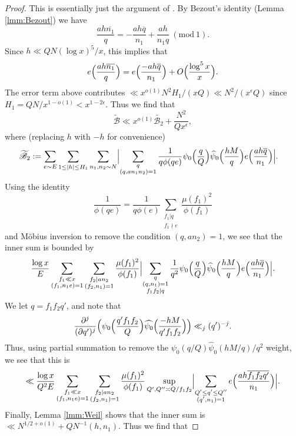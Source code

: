 \documentclass[10pt]{amsart}
\theoremstyle{plain}
\numberwithin{equation}{section}
\newcommand{\Mod}[1]{\ (\mathrm{mod}\ #1)}
\renewcommand{\hat}[1]{\widehat #1}
\begin{document}
\begin{proof}
This is essentially just the argument of \cite[\S5]{BFI1}. By Bezout's identity (Lemma \ref{lmm:Bezout}) we have
\[
\frac{ah \overline{n_1}}{q}=-\frac{ah \overline{q}}{n_1}+\frac{a h}{n_1q} \Mod{1}.
\]
Since $h\ll QN(\log{x})^5/x$, this implies that
\[
e\Bigl(\frac{a h \overline{n_1}}{q}\Bigr)=e\Bigl(\frac{- a h \overline{q}}{n_1}\Bigr)+O\Bigl(\frac{\log^5{x}}{x}\Bigr).
\]
The error term above contributes $\ll x^{o(1)} N^2 H_1 / (x Q)\ll N^2/(x^\epsilon Q)$ since $H_1=Q N/x^{1-o(1)}<x^{1-2\epsilon}$. Thus we find that
\[
\widetilde{\mathscr{B}}\ll x^{o(1)}\widetilde{\mathscr{B}_2}+\frac{N^2}{Q x^\epsilon},
\] 
where (replacing $h$ with $-h$ for convenience)
\begin{align*}
\widetilde{\mathscr{B}_2}&:=\sum_{e\sim E}\sum_{1\le |h|\le H_1}\sum_{\substack{n_1,n_2\sim N}}\Bigl|\sum_{\substack{q\\ (q,a n_1 n_2)=1}}\frac{1}{q\phi(q e)}\psi_0\Bigl(\frac{q}{Q}\Bigr)\hat{\psi_0}\Bigl(\frac{h M}{q}\Bigr)e\Bigl(\frac{a h \overline{q}}{n_1}\Bigr)\Bigr|.
\end{align*}
Using the identity
\[
\frac{1}{\phi(q e)}=\frac{1}{q\phi(e)}\sum_{\substack{f_1|q\\ f_1\nmid e}}\frac{\mu(f_1)^2}{\phi(f_1)}
\]
and M\"obius inversion to remove the condition $(q,an_2)=1$, we see that the inner sum is bounded by
\[
\frac{\log{x}}{E}\sum_{\substack{f_1\ll x\\(f_1,n_1e)=1}}\sum_{\substack{f_2|a n_2\\ (f_2,n_1)=1}}\frac{\mu(f_1)^2}{\phi(f_1)}\Bigl|\sum_{\substack{q\\ (q,n_1)=1\\ f_1 f_2|q}}\frac{1}{q^2}\psi_0\Bigl(\frac{q}{Q}\Bigr)\hat{\psi_0}\Bigl(\frac{h M}{q}\Bigr)e\Bigl(\frac{a h \overline{q}}{n_1}\Bigr)\Bigr|.
\]
We let $q=f_1f_2 q'$, and note that
\[
\frac{\partial^j}{(\partial q')^j}\Bigl(\psi_0\Bigl(\frac{q'f_1f_2}{Q}\Bigr)\widehat{\psi_0}\Bigl(\frac{-hM}{q'f_1f_2}\Bigr)\Bigr)\ll_j (q')^{-j}.
\]
Thus, using partial summation to remove the $\psi_0(q/Q)\hat{\psi_0}(h M/q)/q^2$ weight, we see that this is
\[
\ll \frac{\log{x}}{Q^2 E}\sum_{\substack{f_1\ll x\\(f_1,n_1e)=1}}\sum_{\substack{f_2|a n_2\\ (f_2,n_1)=1}}\frac{\mu(f_1)^2}{\phi(f_1)}\sup_{Q',Q''\asymp Q/f_1 f_2}\Bigl|\sum_{\substack{Q' \le q'\le Q''\\ (q',n_1)=1}}e\Bigl(\frac{a h \overline{f_1f_2q'}}{n_1}\Bigr)\Bigr|.
\]
Finally, Lemma \ref{lmm:Weil} shows that the inner sum is $\ll N^{1/2+o(1)}+Q N^{-1}(h,n_1)$. Thus we find that

\end{proof}
\end{document}
